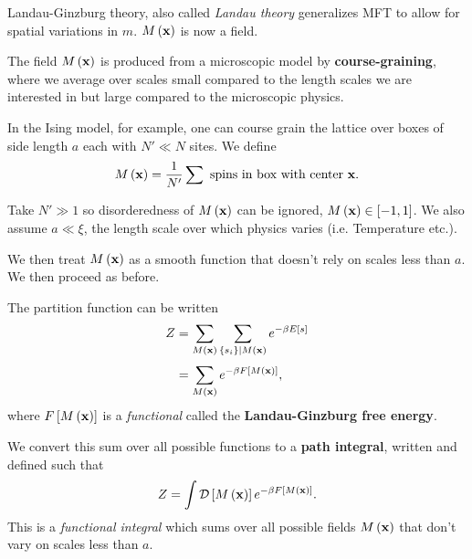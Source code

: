 Landau-Ginzburg theory, also called \textit{Landau theory} generalizes MFT to allow for spatial variations in $m$. $M\left( \vb{x} \right) $ is now a field.

The field $M\left( \vb{x} \right) $ is produced from a microscopic model by \textbf{course-graining}, where we average over scales small compared to the length scales we are interested in but large compared to the microscopic physics.

In the Ising model, for example, one can course grain the lattice over boxes of side length $a$ each with $N' \ll N$ sites. We define
\begin{align}
    M\left( \vb{x} \right) = \frac{1}{N'} \sum \text{~spins in box with center $\vb{x}$}
.\end{align}

Take $N' \gg 1$ so disorderedness of $M\left( \vb{x} \right) $ can be ignored, $M\left( \vb{x} \right)  \in \left[ -1,1 \right] $. We also assume $a \ll \xi$, the length scale over which physics varies (i.e. Temperature etc.).

We then treat $M \left( \vb{x} \right) $ as a smooth function that doesn't rely on scales less than $a$. We then proceed as before.

The partition function can be written
\begin{align}
    Z &= \sum_{M \left( \vb{x} \right) } \sum_{\{s_{i}\}  \mid M\left( \vb{x} \right) } e^{-\beta E \left[ s \right] } \\
      &=  \sum_{M \left( \vb{x} \right) }^{} e^{-\beta F \left[ M \left( \vb{x} \right)  \right] }
  ,\end{align}
  where $F \left[ M \left( \vb{x} \right)  \right] $ is a \textit{functional} called the \textbf{Landau-Ginzburg free energy}.

\begin{definition}
    We convert this sum over all possible functions to a \textbf{path integral}, written and defined such that
    \begin{align}
        Z = \int \mathcal{D}\left[ M\left( \vb{x} \right) \right]  e^{-\beta F \left[ M \left( \vb{x} \right)  \right] }
    .\end{align}
    This is a \textit{functional integral} which sums over all possible fields $M\left( \vb{x} \right) $ that don't vary on scales less than $a$.
\end{definition}








